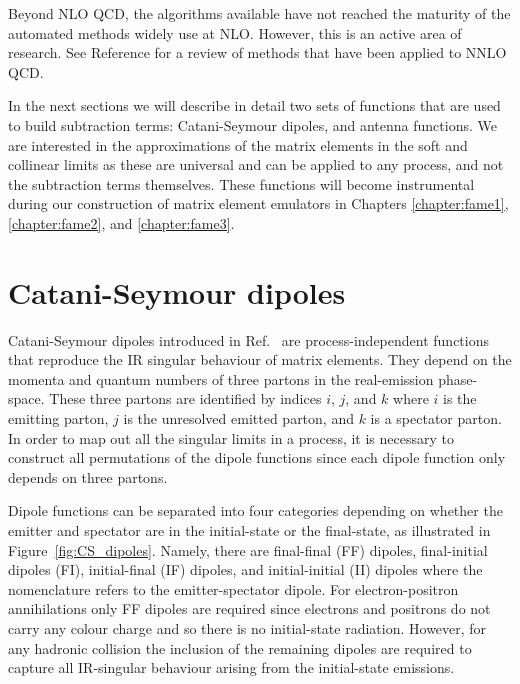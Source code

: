 \documentclass[main.tex]{subfiles}
\begin{document}
    Beyond NLO QCD, the algorithms available have
    not reached the maturity of the automated methods widely use
    at NLO. However, this is an active area of
    research. See Reference \cite{TorresBobadilla:2020ekr} for a review of methods
    that have been applied to NNLO QCD.

    In the next sections we will describe in detail two sets of functions
    that are used to build subtraction terms: Catani-Seymour dipoles, and
    antenna functions. We are interested in the approximations of the matrix elements
    in the soft and collinear limits as these are universal and can
    be applied to any process, and not the subtraction terms themselves.
    These functions will become instrumental
    during our construction of matrix element emulators in Chapters
    \ref{chapter:fame1}, \ref{chapter:fame2}, and \ref{chapter:fame3}.

\section{Catani-Seymour dipoles}\label{sec:CS_dipoles}
    Catani-Seymour dipoles introduced in Ref.~\cite{Catani:1996vz}
    are process-independent functions that reproduce the IR
    singular behaviour of matrix elements. They depend on the
    momenta and quantum numbers of three partons in the real-emission
    phase-space. These three partons are identified by indices
    $i$, $j$, and $k$ where $i$ is the emitting parton, $j$ is
    the unresolved emitted parton, and $k$ is a spectator parton.
    In order to map out all the singular limits in a process, it is
    necessary to construct all permutations of the dipole functions
    since each dipole function only depends on three partons.

    Dipole functions can be separated into four categories
    depending on whether the emitter and spectator are in the
    initial-state or the final-state, as illustrated in Figure~\ref{fig:CS_dipoles}.
    Namely, there are final-final (FF) dipoles, final-initial dipoles (FI),
    initial-final (IF) dipoles, and initial-initial (II) dipoles where
    the nomenclature refers to the emitter-spectator dipole.
    For electron-positron annihilations only FF dipoles are required
    since electrons and positrons do not carry any colour charge
    and so there is no initial-state radiation.
    However, for any hadronic collision the inclusion of the remaining
    dipoles are required to capture all IR-singular behaviour arising
    from the initial-state emissions.
\end{document}
